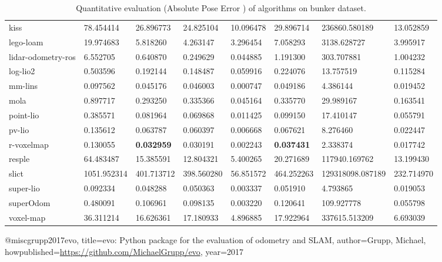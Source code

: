\begin{table}[]
{\begin{tabular}{llllllll}
		kiss & 78.454414 & 26.896773 & 24.825104 & 10.096478 & 29.896714 & 236860.580189 & 13.052859 \\
		lego-loam & 19.974683 & 5.818260 & 4.263147 & 3.296454 & 7.058293 & 3138.628727 & 3.995917 \\
		lidar-odometry-ros & 6.552705 & 0.640870 & 0.249629 & 0.044885 & 1.191300 & 303.707881 & 1.004232 \\
		log-lio2 & 0.503596 & 0.192144 & 0.148487 & 0.059916 & 0.224076 & 13.757519 & 0.115284 \\
		mm-lins & 0.097562 & 0.045176 & 0.046003 & 0.000747 & 0.049186 & 4.386144 & 0.019452 \\
		mola & 0.897717 & 0.293250 & 0.335366 & 0.045164 & 0.335770 & 29.989167 & 0.163541 \\
		point-lio & 0.385571 & 0.081964 & 0.069868 & 0.011425 & 0.099150 & 17.410147 & 0.055791 \\
		pv-lio & 0.135612 & 0.063787 & 0.060397 & 0.006668 & 0.067621 & 8.276460 & 0.022447 \\
		r-voxelmap & 0.130055 & \textbf{0.032959} & 0.030191 & 0.002243 & \textbf{0.037431} & 2.338374 & 0.017742 \\
		resple & 64.483487 & 15.385591 & 12.804321 & 5.400265 & 20.271689 & 117940.169762 & 13.199430 \\
		slict & 1051.952314 & 401.713712 & 398.560280 & 56.851572 & 464.252263 & 129318098.087189 & 232.714970 \\
		super-lio & 0.092334 & 0.048288 & 0.050363 & 0.003337 & 0.051910 & 4.793865 & 0.019053 \\
		superOdom & 0.480091 & 0.106961 & 0.098135 & 0.003220 & 0.120641 & 109.927778 & 0.055798 \\
		voxel-map & 36.311214 & 16.626361 & 17.180933 & 4.896885 & 17.922964 & 337615.513209 & 6.693039 \\
        	\end{tabular}%
        }
        	\caption{Quantitative evaluation (Absolute Pose Error \cite{grupp2017evo}) of algorithms on bunker dataset.}
        	\label{table3}
\end{table}

@misc{grupp2017evo,
  title={evo: Python package for the evaluation of odometry and SLAM},
  author={Grupp, Michael},
  howpublished={\url{https://github.com/MichaelGrupp/evo}},
  year={2017}
}
